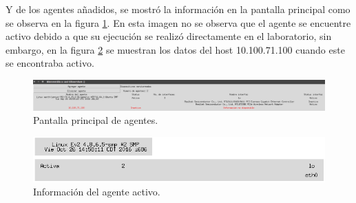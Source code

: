 Y de los agentes añadidos, se mostró la información en la pantalla principal como se observa en la figura \ref{image:agentes}. En esta imagen no se observa que el agente se encuentre activo debido a que su ejecución se realizó directamente en el laboratorio, sin embargo, en la figura \ref{image:agentes2} se muestran los datos del host 10.100.71.100 cuando este se encontraba activo.
\FloatBarrier
\begin{figure}[htbp!]
		\centering
			\includegraphics[width=1.1 \textwidth]{images/agentes}
		\caption{Pantalla principal de agentes.}
		\label{image:agentes}
\end{figure}
\FloatBarrier
\FloatBarrier
\begin{figure}[htbp!]
		\centering
			\includegraphics[width=1 \textwidth]{images/datos1}
		\caption{Información del agente activo.}
		\label{image:agentes2}
\end{figure}
\FloatBarrier

